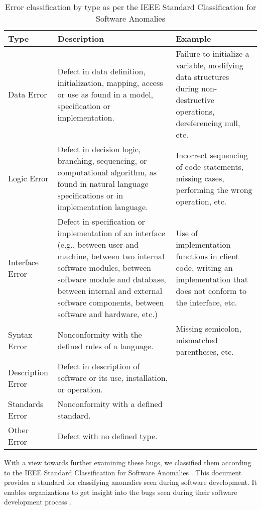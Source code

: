 \documentclass{sig-alternate}
\begin{document}
\begin{table*}
\def\arraystretch{1.75}
\centering
\caption{Error classification by type as per the IEEE Standard Classification for Software Anomalies \cite{IEEE10}}
\label{table:IEEE}
\begin{tabular}{|p{1in}|p{3in}|p{2.4in}|} \hline
\textbf{Type} & \textbf{Description} & \textbf{Example}\\ \hline
Data Error&
Defect in data definition, initialization, mapping, access or use as found in a model, specification or implementation.&
Failure to initialize a variable, modifying data structures during non-destructive operations, dereferencing null, etc.\\ \hline

Logic Error&
Defect in decision logic, branching, sequencing, or computational algorithm, as found in natural language specifications or in
implementation language.&
Incorrect sequencing of code statements, missing cases, performing the wrong operation, etc.\\ \hline

Interface Error&
Defect in specification or implementation of an interface (e.g., between user and machine, between two internal software modules, between software module and database, between internal and external software components, between software and hardware, etc.)&
Use of implementation functions in client code, writing an implementation that does not conform to the interface, etc.\\ \hline

Syntax Error&
Nonconformity with the defined rules of a language.&
Missing semicolon, mismatched parentheses, etc.\\ \hline

Description Error&
Defect in description of software or its use, installation, or operation.&
\\ \hline

Standards Error&
Nonconformity with a defined standard.&
\\ \hline

Other Error&
Defect with no defined type.
&
\\ \hline
\end{tabular}
\end{table*}


With a view towards further examining these bugs, we classified them according to the IEEE Standard Classification for Software Anomalies \cite{IEEE10}. This document provides a standard for classifying anomalies seen during software development. It enables organizations to get insight into the bugs seen during their software development process \cite{IEEE10}.\\
\end{document}
